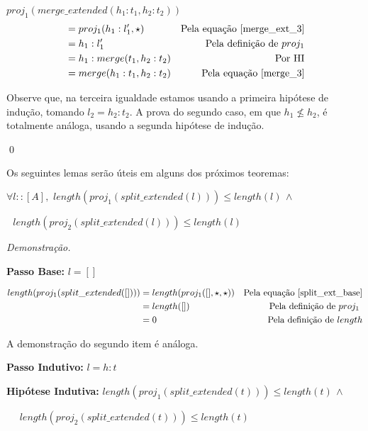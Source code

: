 \documentclass[12pt, oneside, a4paper,english,brazil]{abntex2}
\begin{document}
$ proj_{1}(merge\_extended(h_{1} : t_{1}, h_{2} : t_{2})) $
\begin{align*}
 &= proj_{1}(h_{1} : l'_{1}, \star) &\text{Pela equa\c{c}\~ao \ref{merge_ext_3}} \\
                                                          &= h_{1} : l'_{1} &\text{Pela defini\c{c}\~ao de $proj_{1}$} \\
  &= h_{1} : merge(t_{1}, h_{2} : t_{2}) &\text{Por HI} \\
  &= merge(h_{1} : t_{1}, h_{2} : t_{2}) &\text{Pela equa\c{c}\~ao \ref{merge_3}}
\end{align*}

Observe que, na terceira igualdade estamos usando a primeira hip\'otese de indu\c{c}\~ao, tomando $l_{2} = h_{2} : t_{2}$. A prova do segundo caso, em que $h_{1} \not\le h_{2}$, \'e totalmente an\'aloga, usando a segunda hip\'otese de indu\c{c}\~ao.

\qed

Os seguintes lemas ser\~ao \'uteis em alguns dos pr\'oximos teoremas:

\begin{lema} \label{split_le}
  $\forall l :: [A], \,\, length(proj_{1}(split\_extended(l))) \le length(l)\, \wedge$

  \qquad \qquad \qquad \qquad \,\, $length(proj_{2}(split\_extended(l))) \le length(l)$
\end{lema}

\noindent \textit{Demonstra\c{c}\~ao.}

\textbf{Passo Base: } $l = []$

\begin{align*}
  length(proj_{1}(split\_extended([]))) &= length(proj_{1}([], \star, \star)) &\text{Pela equa\c{c}\~ao \ref{split_ext_base}}\\
                                        &= length([]) &\text{Pela defini\c{c}\~ao de $proj_{1}$ }\\
  &= 0 &\text{Pela defini\c{c}\~ao de $length$}\\
\end{align*}

A demonstra\c{c}\~ao do segundo item \'e an\'aloga.

\textbf{Passo Indutivo: } $l = h : t$

\textbf{Hip\'otese Indutiva: } $length(proj_{1}(split\_extended(t))) \le length(t)\, \wedge$

\qquad \qquad \qquad \qquad \quad \,\,\,\,\,\,  $length(proj_{2}(split\_extended(t))) \le length(t)$
\end{document}
